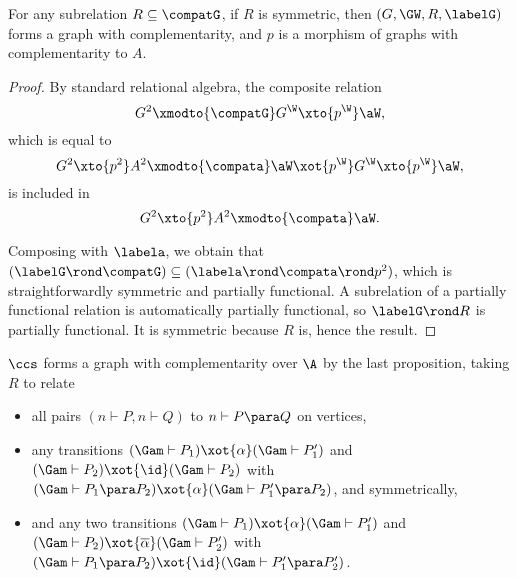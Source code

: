 \documentclass{LMCS}
\theoremstyle{plain}\newtheorem{satz}[thm]{Satz}
\begin{document}
    \begin{prop}\label{prop:compatpR}
      For any subrelation $R \subseteq \compatG$, if $R$
      is symmetric, then $(G,\GW,R,\labelG)$ forms a graph
      with complementarity, and $p$ is a morphism of graphs with
      complementarity to $A$.
    \end{prop}
    \begin{proof}
    By standard relational algebra, the composite relation
    $$G^2 \xmodto{\compatG} G^\W \xto{p^\W} \aW,$$
    which is equal to
    $$G^2 \xto{p^2} A^2 \xmodto{\compata} \aW \xot{p^\W} G^\W \xto{p^\W} \aW,$$
    is included in
    $$G^2 \xto{p^2} A^2 \xmodto{\compata} \aW.$$

    Composing with $\labela$, we obtain that $(\labelG \rond \compatG)
    \subseteq (\labela \rond \compata \rond p^2)$, which is
    straightforwardly symmetric and partially functional.  A
    subrelation of a partially functional relation is automatically
    partially functional, so $\labelG \rond R$ is partially functional.
    It is symmetric because $R$ is, hence the result.
    \end{proof}

\begin{exa}\label{ex:lgraphs}
  $\ccs$ forms a graph with complementarity over $\A$ by the last
  proposition, taking $R$ to relate
  \begin{itemize}
  \item all pairs $(n \vdash P, n \vdash Q)$ to $n \vdash P \para Q$
    on vertices,
  \item any transitions $(\Gam \vdash P_1) \xot{\alpha} (\Gam \vdash
    P'_1)$ and $(\Gam \vdash P_2) \xot{\id} (\Gam \vdash P_2)$ with
    $(\Gam \vdash P_1 \para P_2) \xot{\alpha} (\Gam \vdash P'_1 \para
    P_2)$, and symmetrically,
  \item and any two transitions $(\Gam \vdash P_1) \xot{\alpha} (\Gam
    \vdash P'_1)$ and $(\Gam \vdash P_2) \xot{\overline{\alpha}} (\Gam
    \vdash P'_2)$ with $(\Gam \vdash P_1 \para P_2) \xot{\id} (\Gam
    \vdash P'_1 \para P'_2)$.
  \end{itemize}
\end{exa}
\end{document}
